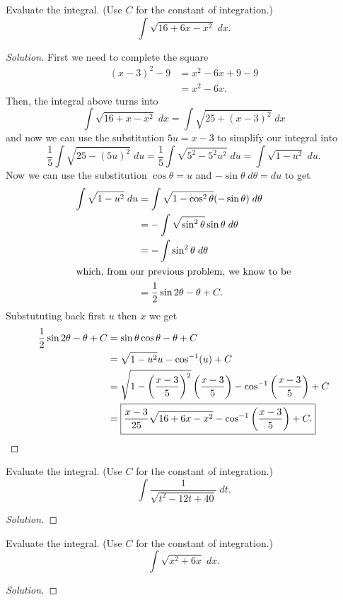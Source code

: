 \begin{problem}[WebAssign, HW 12, \# 3]
Evaluate the integral. (Use $C$ for the constant of integration.)
\[
\int\sqrt{16+6x-x^2}\;dx.
\]
\end{problem}
\begin{proof}[Solution]
First we need to complete the square
\begin{align*}
(x-3)^2-9&=x^2-6x+9-9\\
         &=x^2-6x.
\end{align*}
Then, the integral above turns into
\[
\int\sqrt{16+x-x^2}\;dx=\int\sqrt{25+(x-3)^2}\;dx
\]
and now we can use the substitution $5u=x-3$ to simplify our integral into
\[
\frac{1}{5}\int\sqrt{25-(5u)^2}\;du=
\frac{1}{5}\int\sqrt{5^2-5^2u^2}\;du=
\int\sqrt{1-u^2}\;du.
\]
Now we can use the substitution $\cos\theta=u$ and
$-\sin\theta\;d\theta=du$ to get
\begin{align*}
\int\sqrt{1-u^2}\;du
&=\int\sqrt{1-\cos^2\theta}(-\sin\theta)\;d\theta\\
&=-\int\sqrt{\sin^2\theta}\sin\theta\;d\theta\\
&=-\int\sin^2\theta\;d\theta\\
\intertext{which, from our previous problem, we know to be}
&=\frac{1}{2}\sin 2\theta-\theta+C.
\end{align*}
Substututing back first $u$ then $x$ we get
\begin{align*}
\frac{1}{2}\sin 2\theta-\theta+C
&=\sin\theta\cos\theta-\theta+C\\
&=\sqrt{1-u^2}u-\cos^{-1}(u)+C\\
&=\sqrt{1-\left(\frac{x-3}{5}\right)^2}\left(\frac{x-3}{5}\right)-\cos^{-1}\left(\frac{x-3}{5}\right)+C\\
&=\boxed{\frac{x-3}{25}\sqrt{16+6x-x^2}-\cos^{-1}\left(\frac{x-3}{5}\right)+C.}\qedhere
\end{align*}
\end{proof}

\begin{problem}[WebAssign, HW 12, \# 4]
Evaluate the integral. (Use $C$ for the constant of integration.)
\[
\int\frac{1}{\sqrt{t^2-12t+40}}\;dt.
\]
\end{problem}
\begin{proof}[Solution]
\end{proof}

\begin{problem}[WebAssign, HW 12, \# 5]
Evaluate the integral. (Use $C$ for the constant of integration.)
\[
\int\sqrt{x^2+6x}\;dx.
\]
\end{problem}
\begin{proof}[Solution]
\end{proof}


